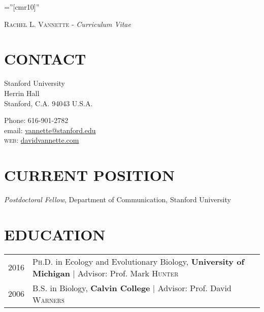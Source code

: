 \documentclass[a4paper,10pt]{article} %
\begin{document}
\pagestyle{empty} %

\font\fb=''[cmr10]'' %

\textsc{\LARGE Rachel L. Vannette} - \textit{\LARGE Curriculum Vitae}\\

\section{\small CONTACT}
\begin{minipage}[t]{0.5\textwidth}
Stanford University\\
Herrin Hall\\
Stanford, C.A. 94043
U.S.A.\\
\end{minipage}
\begin{minipage}[t]{0.5\textwidth}
Phone: 616-901-2782\\
email: \href{mailto:vannette@stanford.edu}{vannette@stanford.edu}\\
\textsc{web}: \href{davidvannette.com}{davidvannette.com}
\end{minipage}

\section{\small CURRENT POSITION}
\emph{Postdoctoral Fellow}, Department of Communication, Stanford University


\section{\small EDUCATION}

\begin{tabular}{rl}
\smallskip	
\textsc{2016} & \textsc{Ph.D.} in Ecology and Evolutionary Biology, \textbf{University of Michigan} | \small Advisor: Prof. Mark \textsc{Hunter}\\
\smallskip


\textsc{2006} & \textsc{B.S.} in Biology, \textbf{Calvin College} | \small Advisor: Prof. David \textsc{Warners}\\

\end{tabular}
\end{document}
